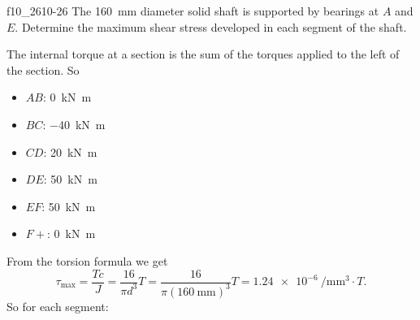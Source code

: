 
\begin{problemwithimage}{f10_26}{10-26}
  The \qty{160}{\mm} diameter solid shaft is supported by bearings at $A$ and $E$.
  Determine the maximum shear stress developed in each segment of the shaft.
\end{problemwithimage}

\begin{derivation}
  The internal torque at a section is the sum of the torques applied to the left of the section.
  So
  \begin{itemize}
    \item $AB$: \qty{0}{\kN.\m}
    \item $BC$: \qty{-40}{\kN.\m} 
    \item $CD$: \qty{20}{\kN.\m} 
    \item $DE$: \qty{50}{\kN.\m}
    \item $EF$: \qty{50}{\kN.\m}
    \item $F+$: \qty{0}{\kN.\m} 
  \end{itemize}
  From the torsion formula we get
  \begin{equation*}
    \tau_{\mathrm{max}} = \frac{Tc}{J} = \frac{16}{\pi d^3} T = \frac{16}{\pi \left( \qty{160}{\mm}  \right)^3} T = \qty{1,24e-6}{\per\mm^3} \cdot T 
  .\end{equation*}
  So for each segment:
\end{derivation}

